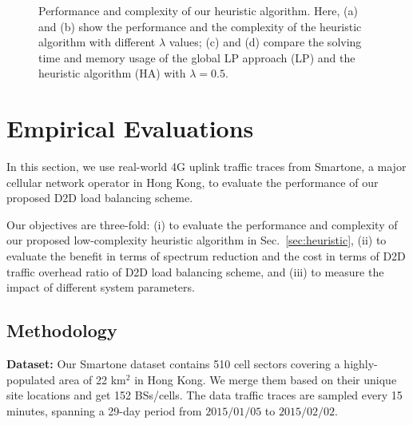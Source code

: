 \begin{figure*}
  \centering
  \caption{Performance and complexity of our heuristic algorithm. Here,
  (a) and (b) show the performance and the complexity of the heuristic algorithm with different $\lambda$ values; (c) and (d) compare the solving time and memory usage of the global LP approach (LP)
and the heuristic algorithm (HA) with $\lambda=0.5$.}
  \label{fig:performance-complexity-heuristic} %
\end{figure*}




\section{Empirical Evaluations} \label{sec:simulation}
In this section, we use real-world 4G uplink traffic traces from Smartone, a major cellular network operator
in Hong Kong, to evaluate the performance of our proposed D2D load balancing scheme.

Our objectives are three-fold: (i) to evaluate the performance and complexity of our proposed low-complexity heuristic algorithm
in Sec.~\ref{sec:heuristic},
(ii) to evaluate the benefit in terms of spectrum reduction
and the cost in terms of D2D traffic overhead ratio of D2D load balancing scheme,
and (iii) to measure the impact of different system parameters.

\subsection{Methodology}
\textbf{Dataset:} Our Smartone dataset contains 510 cell sectors covering a highly-populated area of 22 km$^2$ in Hong Kong.
We merge them based on their unique site locations and get 152 BSs/cells. The data traffic traces
are sampled every 15 minutes, spanning a 29-day period from $2015/01/05$ to $2015/02/02$.

